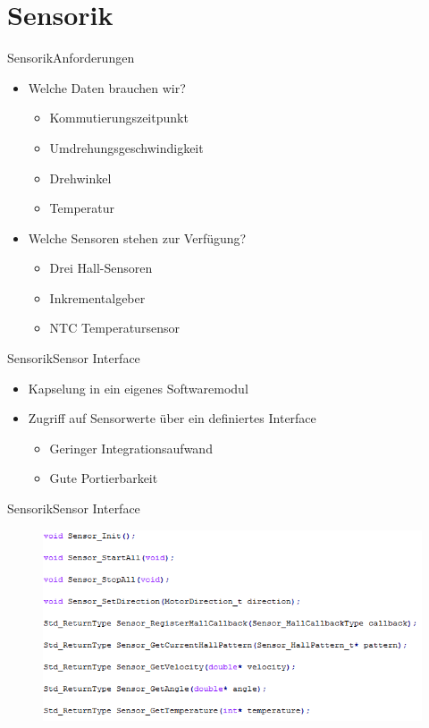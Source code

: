 \author{Andreas Lackner}
\section{Sensorik}

\begin{frame}{Sensorik}{Anforderungen}
  \begin{itemize}
    \item Welche Daten brauchen wir?
    \begin{itemize}
    \item Kommutierungszeitpunkt
    \item Umdrehungsgeschwindigkeit
    \item Drehwinkel
    \item Temperatur
    \end{itemize}
    \item Welche Sensoren stehen zur Verfügung?
    \begin{itemize}
      \item Drei Hall-Sensoren
      \item Inkrementalgeber
      \item NTC Temperatursensor
    \end{itemize}
  \end{itemize}
\end{frame}

\begin{frame}{Sensorik}{Sensor Interface}	
  \begin{itemize}
    \item Kapselung in ein eigenes Softwaremodul
    \item Zugriff auf Sensorwerte über ein definiertes Interface
    \begin{itemize}
      \item Geringer Integrationsaufwand
      \item Gute Portierbarkeit
    \end{itemize}
  \end{itemize}
\end{frame}

\begin{frame}{Sensorik}{Sensor Interface}	
 \begin{figure} [htbp]
  \centering
  \includegraphics[scale=0.6]{Sensor/sensor_interface.PNG}
 \end{figure}
\end{frame}

